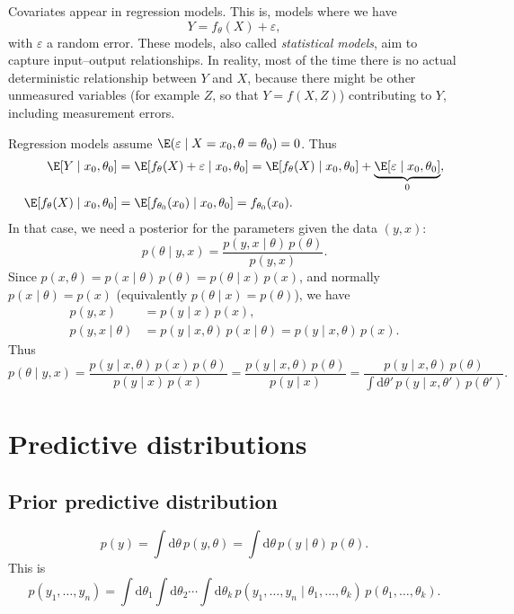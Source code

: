 Covariates appear in regression models. This is, models where we have
\[
Y = f_\theta(X) + \varepsilon,
\]
with $\varepsilon$ a random error. These models, also called \emph{statistical models}, aim to capture input--output relationships. In reality, most of the time there is no actual deterministic relationship between $Y$ and $X$, because there might be other unmeasured variables (for example $Z$, so that $Y = f(X, Z)$) contributing to $Y$, including measurement errors.

Regression models assume $\E(\varepsilon \mid X = x_0, \theta = \theta_0) = 0$. Thus
\begin{align*}
\E[Y \mid x_0, \theta_0] &= \E[f_\theta(X) + \varepsilon \mid x_0, \theta_0] = \E[f_\theta(X) \mid x_0, \theta_0] + \underbrace{\E[\varepsilon \mid x_0, \theta_0]}_{0},\\
\E[f_\theta(X) \mid x_0, \theta_0] &= \E[f_{\theta_0}(x_0) \mid x_0, \theta_0] = f_{\theta_0}(x_0).
\end{align*}
In that case, we need a posterior for the parameters given the data $(y, x)$:
\[
p(\theta \mid y, x) = \frac{p(y, x \mid \theta)\,p(\theta)}{p(y, x)}.
\]
Since $p(x, \theta) = p(x \mid \theta)\,p(\theta) = p(\theta \mid x)\,p(x)$, and normally $p(x \mid \theta) = p(x)$ (equivalently $p(\theta \mid x) = p(\theta)$), we have
\begin{align*}
p(y, x) &= p(y \mid x)\,p(x),\\
p(y, x \mid \theta) &= p(y \mid x, \theta)\,p(x \mid \theta) = p(y \mid x, \theta)\,p(x).
\end{align*}
Thus
\[
p(\theta \mid y, x) = \frac{p(y \mid x, \theta)\,p(x)\,p(\theta)}{p(y \mid x)\,p(x)}
= \frac{p(y \mid x, \theta)\,p(\theta)}{p(y \mid x)}
= \frac{p(y \mid x, \theta)\,p(\theta)}{\int \mathrm{d}\theta'\,p(y \mid x, \theta')\,p(\theta')}.
\]

\section{Predictive distributions}

\subsection{Prior predictive distribution}
\[
p(y) = \int \mathrm{d}\theta\,p(y, \theta) = \int \mathrm{d}\theta\,p(y \mid \theta)\,p(\theta).
\]
This is
\[
p(y_1, \dots, y_n) = \int \mathrm{d}\theta_1\int \mathrm{d}\theta_2\cdots\int \mathrm{d}\theta_k\,p(y_1, \dots, y_n \mid \theta_1, \dots, \theta_k)\,p(\theta_1, \dots, \theta_k).
\]

